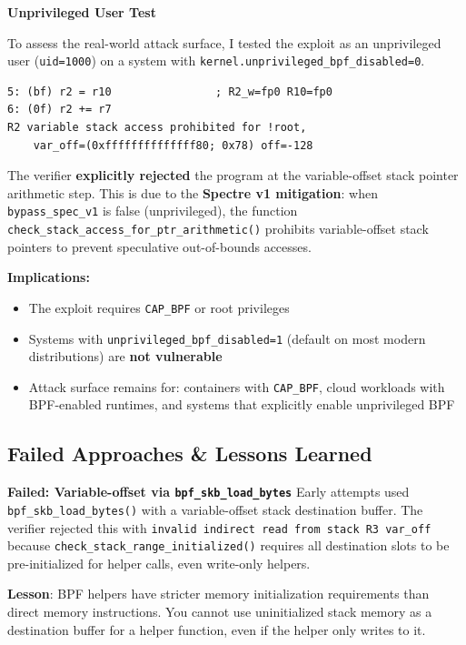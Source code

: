 \textbf{Unprivileged User Test}

To assess the real-world attack surface, I tested the exploit as an unprivileged user (\texttt{uid=1000}) on a system with \texttt{kernel.unprivileged\_bpf\_disabled=0}.

\begin{lstlisting}[style=log,caption={Verifier rejection for unprivileged user}]
5: (bf) r2 = r10                ; R2_w=fp0 R10=fp0
6: (0f) r2 += r7
R2 variable stack access prohibited for !root,
    var_off=(0xffffffffffffff80; 0x78) off=-128
\end{lstlisting}

The verifier \textbf{explicitly rejected} the program at the variable-offset stack pointer arithmetic step. This is due to the \textbf{Spectre v1 mitigation}: when \texttt{bypass\_spec\_v1} is false (unprivileged), the function \texttt{check\_stack\_access\_for\_ptr\_arithmetic()} prohibits variable-offset stack pointers to prevent speculative out-of-bounds accesses.

\textbf{Implications:}
\begin{itemize}
    \item The exploit requires \texttt{CAP\_BPF} or root privileges
    \item Systems with \texttt{unprivileged\_bpf\_disabled=1} (default on most modern distributions) are \textbf{not vulnerable}
    \item Attack surface remains for: containers with \texttt{CAP\_BPF}, cloud workloads with BPF-enabled runtimes, and systems that explicitly enable unprivileged BPF
\end{itemize}


\subsection{Failed Approaches \& Lessons Learned}

\textbf{Failed: Variable-offset via \texttt{bpf\_skb\_load\_bytes}}
Early attempts used \texttt{bpf\_skb\_load\_bytes()} with a variable-offset stack destination buffer. The verifier rejected this with \texttt{invalid indirect read from stack R3 var\_off} because \texttt{check\_stack\_range\_initialized()} requires all destination slots to be pre-initialized for helper calls, even write-only helpers.

\textbf{Lesson}: BPF helpers have stricter memory initialization requirements than direct memory instructions. You cannot use uninitialized stack memory as a destination buffer for a helper function, even if the helper only writes to it.

